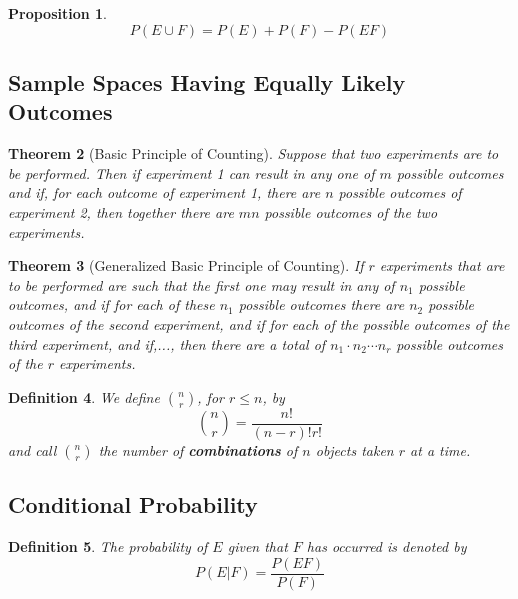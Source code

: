 \documentclass[12pt]{article}
\newtheorem{theorem}{Theorem}
\newtheorem{definition}[theorem]{Definition}
\newtheorem{proposition}[theorem]{Proposition}
\begin{document}
\begin{proposition}
  \begin{equation*}
    P(E \cup F) = P(E) + P(F) - P(EF)
  \end{equation*}
\end{proposition}

\subsection{Sample Spaces Having Equally Likely Outcomes}

\begin{theorem} [Basic Principle of Counting]
  Suppose that two experiments are to be performed. Then if experiment 1 can result in any one of $m$ possible outcomes and if, for each outcome of experiment 1, there are $n$ possible outcomes of experiment 2, then together there are $mn$ possible outcomes of the two experiments.
\end{theorem}

\begin{theorem} [Generalized Basic Principle of Counting]
  If $r$ experiments that are to be performed are such that the first one may result in any of $n_1$ possible outcomes, and if for each of these $n_1$ possible outcomes there are $n_2$ possible outcomes of the second experiment, and if for each of the possible outcomes of the third experiment, and if,..., then there are a total of $n_1 \cdot n_2 \cdots n_r$ possible outcomes of the $r$ experiments.
\end{theorem}

\begin{definition}
  We define $\binom {n}{r}$, for $r \le n$, by
  \begin{equation*}
    \binom {n}{r} = \frac {n!}{(n-r)!r!}
  \end{equation*}
  and call $\binom {n}{r}$ the number of \textbf{combinations} of $n$ objects taken $r$ at a time.
\end{definition}

\subsection{Conditional Probability}

\begin{definition}
  The probability of $E$ given that $F$ has occurred is denoted by
  \begin{equation*}
    P(E|F) = \frac {P(EF)}{P(F)}
  \end{equation*}
\end{definition}
\end{document}
